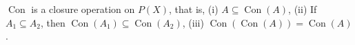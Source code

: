 $\operatorname{Con}$ is a closure operation on $P(X)$, that is,
(i) $A \subseteq \operatorname{Con}(A)$,
(ii) If $A_1 \subseteq A_2$, then $\operatorname{Con}(A_1) \subseteq \operatorname{Con}(A_2)$,
(iii) $\operatorname{Con}(\operatorname{Con}(A)) = \operatorname{Con}(A)$.
